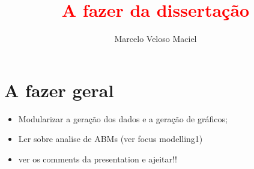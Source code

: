 \documentclass{article}
\title{\textcolor{red}{A fazer da dissertação}}
\author{Marcelo Veloso Maciel}
\date{}
\begin{document}
\pagecolor{base03}
\color{base1}

\maketitle


\section*{A fazer geral}
\begin{itemize}
\item Modularizar a geração dos dados e a geração de gráficos;
\item Ler sobre analise de ABMs (ver focus modelling1)
  \item ver os comments da presentation e ajeitar!!
\end{itemize}
\end{document}
